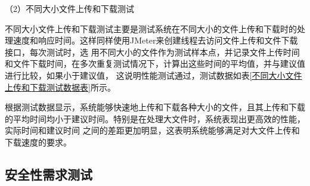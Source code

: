 （2）不同大小文件上传和下载测试

不同大小文件上传和下载测试主要是测试系统在不同大小的文件上传和下载时的处理速度和响应时间。这样同样使用JMeter来创建线程去访问文件上传和文件下载接口，每次测试时，选
用不同大小的文件作为测试样本点，并记录文件上传时间和文件下载时间，在多次重复测试情况下，计算出这些时间的平均值，并与建议值进行比较，如果小于建议值，
这说明性能测试通过，测试数据如表\ref{不同大小文件上传和下载测试数据表}所示。

\begin{center}
    \renewcommand\arraystretch{1.5}{
    }
    \vspace{-1cm}
\end{center}

根据测试数据显示，系统能够快速地上传和下载各种大小的文件，且其上传和下载的平均时间均小于建议时间。特别是在处理大文件时，系统表现出更高效的性能，实际时间和建议时间
之间的差距更加明显，这表明系统能够满足对大文件上传和下载速度的要求。

\subsection{安全性需求测试}


